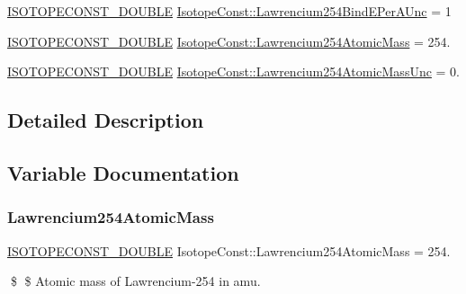 \begin{DoxyCompactItemize}
\mbox{\hyperlink{group___isotope_const-_macros_ga8f45a7272ce02c0b4c65c44636ed719a}{I\+S\+O\+T\+O\+P\+E\+C\+O\+N\+S\+T\+\_\+\+D\+O\+U\+B\+LE}} \mbox{\hyperlink{group___isotope_const-_lawrencium-_lr254_gac13fab1feb31085fa0593fff3cb6f21a}{Isotope\+Const\+::\+Lawrencium254\+Bind\+E\+Per\+A\+Unc}} = 1
\item 
\mbox{\hyperlink{group___isotope_const-_macros_ga8f45a7272ce02c0b4c65c44636ed719a}{I\+S\+O\+T\+O\+P\+E\+C\+O\+N\+S\+T\+\_\+\+D\+O\+U\+B\+LE}} \mbox{\hyperlink{group___isotope_const-_lawrencium-_lr254_ga64f0f9e44159631a50a94c40ffedc5ba}{Isotope\+Const\+::\+Lawrencium254\+Atomic\+Mass}} = 254.
\item 
\mbox{\hyperlink{group___isotope_const-_macros_ga8f45a7272ce02c0b4c65c44636ed719a}{I\+S\+O\+T\+O\+P\+E\+C\+O\+N\+S\+T\+\_\+\+D\+O\+U\+B\+LE}} \mbox{\hyperlink{group___isotope_const-_lawrencium-_lr254_ga1d7a9c6b2753e30004562f8f6c19db77}{Isotope\+Const\+::\+Lawrencium254\+Atomic\+Mass\+Unc}} = 0.
\end{DoxyCompactItemize}


\subsection{Detailed Description}


\subsection{Variable Documentation}
\mbox{\label{group___isotope_const-_lawrencium-_lr254_ga64f0f9e44159631a50a94c40ffedc5ba}} 
\subsubsection{\texorpdfstring{Lawrencium254\+Atomic\+Mass}{Lawrencium254AtomicMass}}
{\footnotesize\ttfamily \mbox{\hyperlink{group___isotope_const-_macros_ga8f45a7272ce02c0b4c65c44636ed719a}{I\+S\+O\+T\+O\+P\+E\+C\+O\+N\+S\+T\+\_\+\+D\+O\+U\+B\+LE}} Isotope\+Const\+::\+Lawrencium254\+Atomic\+Mass = 254.}

\$ \$ Atomic mass of Lawrencium-\/254 in amu. \mbox{\label{group___isotope_const-_lawrencium-_lr254_ga1d7a9c6b2753e30004562f8f6c19db77}} 
